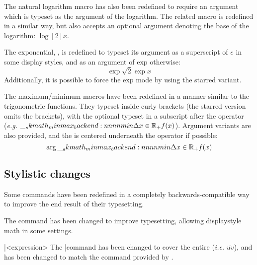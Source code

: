 \documentclass[commonsets,load]{skdoc}
\begin{document}
  \DescribeMacro{}
  The natural logarithm macro \Macro\ln has also been redefined to 
  require an argument which is typeset as the argument of the logarithm.
  \DescribeMacro{}
  The related macro \Macro\log is redefined in a similar way, but also 
  accepts an optional argument denoting the base of the logarithm:
  \(\log[2]{x}\).
 
  \DescribeMacro{}
  The exponential, \Macro\exp, is redefined to typeset its argument as a
  superscript of \(e\) in some display styles, and as an argument of
  \(\mathrm{exp}\) otherwise:
  \begin{equation*}
    \exp{\sqrt{2}\exp{x}}
  \end{equation*}
  Additionally, it is possible to force the \(\mathrm{exp}\) mode by
  using the starred variant.

  \DescribeMacro{}
  \DescribeMacro{}
  \DescribeMacro{}
  \DescribeMacro{}
  \DescribeMacro{}
  \DescribeMacro{}
  The maximum/minimum macros have been redefined in a manner similar to
  the trigonometric functions. They typeset  inside
  curly brackets (the starred version omits the brackets), with the
  optional  typeset in a subscript after the operator
  (\emph{e.g.} \(\min*[x\in\R_{+}]{f(x)}\)). Argument variants are also
  provided, and the  is centered underneath the operator
  if possible:
  \begin{equation*}
    \argmin*[x\in\R_{+}]{f(x)}
  \end{equation*}

  \subsection{Stylistic changes}
  Some commands have been redefined in a completely backwards-compatible
  way to improve the end result of their typesetting.
 
  \DescribeMacro{}
  The \Macro\frac command has been changed to improve typesetting,
  allowing displaystyle math in some settings.
 
  \DescribeMacro\bar{<expression>}
  \DescribeMacro{}
  The \Macro\bar command has been changed to cover the entire 
   (\emph{i.e.} \(\bar{uv}\)), and \Macro\vec has
  been changed to match the  command provided by 
  .
\end{document}
